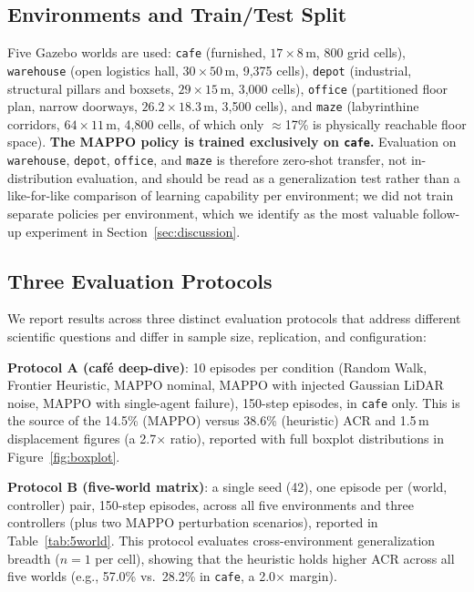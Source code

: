 \documentclass[11pt]{article}
\begin{document}
\subsection{Environments and Train/Test Split}
Five Gazebo worlds are used: \texttt{cafe} (furnished, $17\times8$\,m, 800
grid cells), \texttt{warehouse} (open logistics hall, $30\times50$\,m,
9{,}375 cells), \texttt{depot} (industrial, structural pillars and
boxsets, $29\times15$\,m, 3{,}000 cells), \texttt{office} (partitioned
floor plan, narrow doorways, $26.2\times18.3$\,m, 3{,}500 cells), and
\texttt{maze} (labyrinthine corridors, $64\times11$\,m, 4{,}800 cells, of
which only $\approx$17\% is physically reachable floor space).
\textbf{The MAPPO policy is trained exclusively on \texttt{cafe}.}
Evaluation on \texttt{warehouse}, \texttt{depot}, \texttt{office}, and
\texttt{maze} is therefore zero-shot transfer, not in-distribution
evaluation, and should be read as a generalization test rather than a
like-for-like comparison of learning capability per environment; we did
not train separate policies per environment, which we identify as the
most valuable follow-up experiment in Section~\ref{sec:discussion}.

\subsection{Three Evaluation Protocols}
We report results across three distinct evaluation protocols that address
different scientific questions and differ in sample size, replication,
and configuration:

\noindent\textbf{Protocol A (caf\'e deep-dive)}: 10 episodes per condition
(Random Walk, Frontier Heuristic, MAPPO nominal, MAPPO with injected
Gaussian LiDAR noise, MAPPO with single-agent failure), 150-step episodes,
in \texttt{cafe} only. This is the source of the 14.5\% (MAPPO) versus
38.6\% (heuristic) ACR and 1.5\,m displacement figures (a 2.7$\times$ ratio),
reported with full boxplot distributions in Figure~\ref{fig:boxplot}.

\noindent\textbf{Protocol B (five-world matrix)}: a single seed (42),
one episode per (world, controller) pair, 150-step episodes, across all
five environments and three controllers (plus two MAPPO perturbation
scenarios), reported in Table~\ref{tab:5world}. This protocol evaluates
cross-environment generalization breadth ($n{=}1$ per cell), showing that
the heuristic holds higher ACR across all five worlds (e.g., 57.0\% vs.\ 
28.2\% in \texttt{cafe}, a 2.0$\times$ margin).
\end{document}
